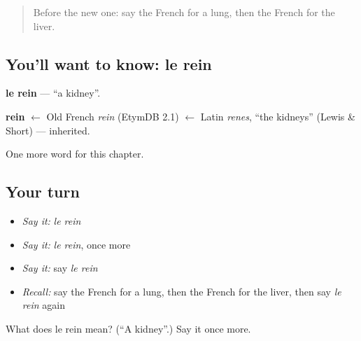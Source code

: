 \begin{quote}
Before the new one: say the French for a lung, then the French for the liver.
\end{quote}

\subsection*{You'll want to know: le rein}
\textbf{le rein} — \textquotedblleft{}a kidney\textquotedblright{}.

\begin{cousinweb}
\textbf{rein} $\leftarrow$ Old French \emph{rein} (EtymDB 2.1) $\leftarrow$ Latin \emph{renes}, \textquotedblleft{}the kidneys\textquotedblright{} (Lewis \& Short) — inherited.
\end{cousinweb}

\begin{grammarlens}[title={What you've built}]
One more word for this chapter.
\end{grammarlens}

\subsection*{Your turn}
\begin{itemize}
\raggedright
  \item \emph{Say it:} \emph{le rein}
  \item \emph{Say it:} \emph{le rein}, once more
  \item \emph{Say it:} say \emph{le rein}
  \item \emph{Recall:} say the French for a lung, then the French for the liver, then say \emph{le rein} again
\end{itemize}

\begin{tcolorbox}[breakable,colback=teal!4,colframe=teal!35!black,title={Before you move on}]
What does le rein mean? (\textquotedblleft{}A kidney\textquotedblright{}.) Say it once more.
\end{tcolorbox}
